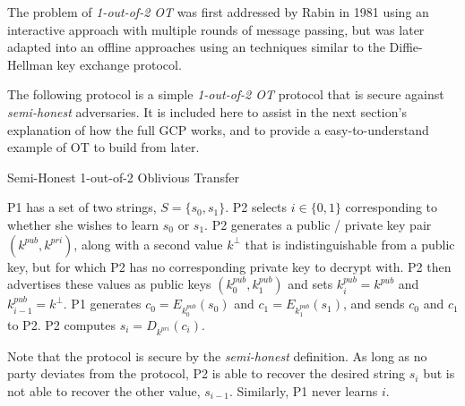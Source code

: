 The problem of \emph{1-out-of-2 \ac{OT}} was first addressed by Rabin\cite{rabin2005exchange} in 1981 using an interactive approach with multiple rounds of message passing, but was later adapted into an offline approaches using an techniques similar to the Diffie-Hellman key exchange protocol\cite{diffie1976new}.

The following protocol\cite{lindell2013technion} is a simple \emph{1-out-of-2 \ac{OT}} protocol that is secure against \emph{semi-honest} adversaries. It is included here to assist in the next section's explanation of how the full \ac{GCP} works, and to provide a easy-to-understand example of \ac{OT} to build from later.

\begin{algorithm}[H]
    \caption{Semi-Honest 1-out-of-2 Oblivious Transfer}
    \label{alg:otsemihonest}
    \begin{algorithmic}[1]
        \STATE \ac{P1} has a set of two strings, $S = \{s_0, s_1\}$.
        \STATE \ac{P2} selects $i \in \{0, 1\}$ corresponding to whether she wishes to learn $s_0$ or $s_1$.
        \STATE \ac{P2} generates a public / private key pair $(k^{pub}, k^{pri})$, along with a second value $k^\bot$ that is indistinguishable from a public key, but for which \ac{P2} has no corresponding private key to decrypt with.
        \STATE \ac{P2} then advertises these values as public keys $(k^{pub}_0, k^{pub}_1)$ and sets $k^{pub}_i = k^{pub}$ and $k^{pub}_{i-1} = k^\bot$.
        \STATE \ac{P1} generates $c_0 = E_{k^{pub}_0}(s_0)$ and $c_1 = E_{k^{pub}_1}(s_1)$, and sends $c_0$ and $c_1$ to \ac{P2}.
        \STATE \ac{P2} computes $s_i = D_{k^{pri}}(c_i)$.
    \end{algorithmic}
\end{algorithm}

Note that the protocol is secure by the \emph{semi-honest} definition. As long as no party deviates from the protocol, \ac{P2} is able to recover the desired string $s_i$ but is not able to recover the other value, $s_{i-1}$. Similarly, \ac{P1} never learns $i$.
